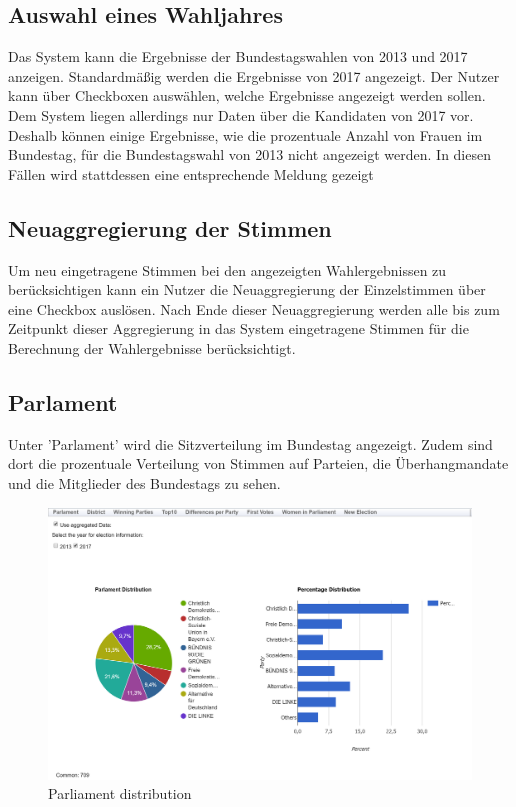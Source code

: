 \documentclass[a4paper]{scrreprt}
\begin{document}
\subsection{Auswahl eines Wahljahres}

Das System kann die Ergebnisse der Bundestagswahlen von 2013 und 2017 anzeigen. Standardmäßig werden die Ergebnisse von 2017 angezeigt. Der Nutzer kann über Checkboxen auswählen, welche Ergebnisse angezeigt werden sollen. Dem System liegen allerdings nur Daten über die Kandidaten von 2017 vor. Deshalb können einige Ergebnisse, wie die prozentuale Anzahl von Frauen im Bundestag, für die Bundestagswahl von 2013 nicht angezeigt werden. In diesen Fällen wird stattdessen eine entsprechende Meldung gezeigt


\subsection{Neuaggregierung der Stimmen}

Um neu eingetragene Stimmen bei den angezeigten Wahlergebnissen zu berücksichtigen kann ein Nutzer die Neuaggregierung der Einzelstimmen über eine Checkbox auslösen. Nach Ende dieser Neuaggregierung werden alle bis zum Zeitpunkt dieser Aggregierung in das System eingetragene Stimmen für die Berechnung der Wahlergebnisse berücksichtigt.


\subsection{Parlament}

Unter 'Parlament' wird die Sitzverteilung im Bundestag angezeigt. Zudem sind dort die prozentuale Verteilung von Stimmen auf Parteien,  die Überhangmandate und die Mitglieder des Bundestags zu sehen. 

\begin{figure}[H]
\centering
\includegraphics[width=\textwidth]{images/parliament_distribution.png}
\caption {Parliament distribution}
\end{figure}
\end{document}
